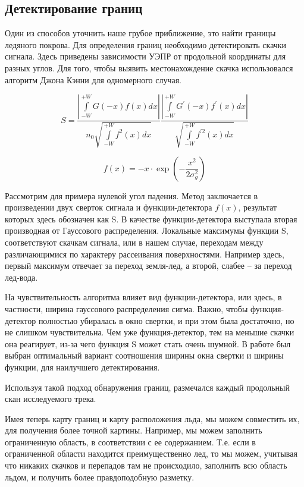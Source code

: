 \subsection{Детектирование границ}
Один из способов уточнить наше грубое приближение, это найти границы ледяного покрова.
Для определения границ необходимо детектировать скачки сигнала. Здесь приведены зависимости УЭПР от продольной
координаты для разных углов. Для того, чтобы выявить местонахождение скачка использовался алгоритм Джона Кэнни \cite{canny} для
одномерного случая.

\begin{equation}
  S = \frac{\left|\int \limits_{-W}^{+W} G(-x) f(x) d x\right|}{n_{0} \sqrt{\int \limits_{-W}^{+W} f^{2}(x) d x}} \frac{\left|\int \limits_{-W}^{+W} G^{\prime}(-x) f^{\prime}(x) d x\right|}{\sqrt{\int \limits_{-W}^{+W} f^{\prime 2}(x) d x}}
  \label{eq:S}
\end{equation}

\begin{equation}
  f(x) = -x\cdot \exp(-\frac{x^2}{2\sigma^2_g})
  \label{eq:fx}
\end{equation}

Рассмотрим для примера нулевой угол падения. Метод заключается в произведении двух сверток сигнала и
функции-детектора $f(x)$, результат которых здесь обозначен как S. В качестве функции-детектора выступала вторая производная от
Гауссового распределения.  Локальные максимумы функции S, соответствуют скачкам сигнала, или в нашем случае, переходам
между различающимися по характеру рассеивания поверхностями. Например здесь, первый максимум отвечает за переход
земля-лед, а второй, слабее – за переход лед-вода. 

На чувствительность алгоритма влияет вид функции-детектора, или здесь, в частности, ширина гауссового распределения
сигма. Важно, чтобы функция-детектор полностью убиралась в окно свертки, и при этом была достаточно, но не слишком
чувствительна. Чем уже функция-детектор, тем на меньшие скачки она реагирует, из-за чего функция S может стать очень
шумной. В работе был выбран оптимальный вариант соотношения ширины окна свертки и ширины функции, для наилучшего
детектирования. 

Используя такой подход обнаружения границ, размечался каждый продольный скан исследуемого трека. 

Имея теперь карту границ и карту расположения льда, мы можем совместить их, для получения более точной картины.
Например, мы можем заполнить ограниченную область, в соответствии с ее содержанием. Т.е. если в ограниченной области
находится преимущественно лед, то мы можем, учитывая что никаких скачков и перепадов там не происходило, заполнить всю
область льдом, и получить более правдоподобную разметку.


